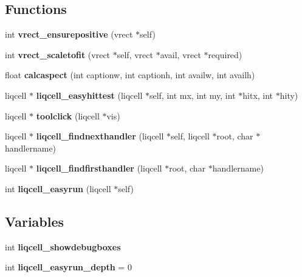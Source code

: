 \subsection*{Functions}
\begin{CompactItemize}
\item 
int \textbf{vrect\_\-ensurepositive} (vrect $\ast$self)\label{d5/d54/liqcell__easyrun_8c_a79b21799806a4e4758071359e7a55a8}

\item 
int \textbf{vrect\_\-scaletofit} (vrect $\ast$self, vrect $\ast$avail, vrect $\ast$required)\label{d5/d54/liqcell__easyrun_8c_6149ae6a654651c6d84acdd1948ba510}

\item 
float \textbf{calcaspect} (int captionw, int captionh, int availw, int availh)\label{d5/d54/liqcell__easyrun_8c_67a2eee3e0ca62ad234470655911f51f}

\item 
liqcell $\ast$ \textbf{liqcell\_\-easyhittest} (liqcell $\ast$self, int mx, int my, int $\ast$hitx, int $\ast$hity)\label{d5/d54/liqcell__easyrun_8c_1d57b390b40eaf9faebdb0adf666b5c4}

\item 
liqcell $\ast$ \textbf{toolclick} (liqcell $\ast$vis)\label{d5/d54/liqcell__easyrun_8c_7e9ecdd0a2ed0adc2b0db9704f686d83}

\item 
liqcell $\ast$ \textbf{liqcell\_\-findnexthandler} (liqcell $\ast$self, liqcell $\ast$root, char $\ast$handlername)\label{d5/d54/liqcell__easyrun_8c_2567893ac242f1078f783d2bbc9caaab}

\item 
liqcell $\ast$ \textbf{liqcell\_\-findfirsthandler} (liqcell $\ast$root, char $\ast$handlername)\label{d5/d54/liqcell__easyrun_8c_a18f64e17afc6df9e933ad21c8d67457}

\item 
int {\bf liqcell\_\-easyrun} (liqcell $\ast$self)
\end{CompactItemize}
\subsection*{Variables}
\begin{CompactItemize}
\item 
int \textbf{liqcell\_\-showdebugboxes}\label{d5/d54/liqcell__easyrun_8c_c32d12b20b2cd2824218716cf3beeb39}

\item 
int \textbf{liqcell\_\-easyrun\_\-depth} = 0\label{d5/d54/liqcell__easyrun_8c_9bdd5318be25bf6c3dec902896199442}

\end{CompactItemize}



